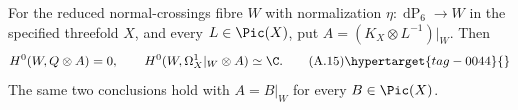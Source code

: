 \begin{proposition}\hypertarget{tag-01AQ}{}\label{cdp:st:A.4.1}


For the reduced normal-crossings fibre $W$ with normalization $\eta:\operatorname{dP}_6\to W$ in the specified threefold $X$, and every $L\in\Pic(X)$, put $A=(K_X\otimes L^{-1})|_W$. Then
\[
H^0(W,Q\otimes A)=0,
\qquad H^0(W,\Omega_X^1|_W\otimes A)\simeq\C.
\tag{A.15}\hypertarget{tag-0044}{}\label{cdp:eq:A.15}
\]
The same two conclusions hold with $A=B|_W$ for every $B\in\Pic(X)$.
\end{proposition}

